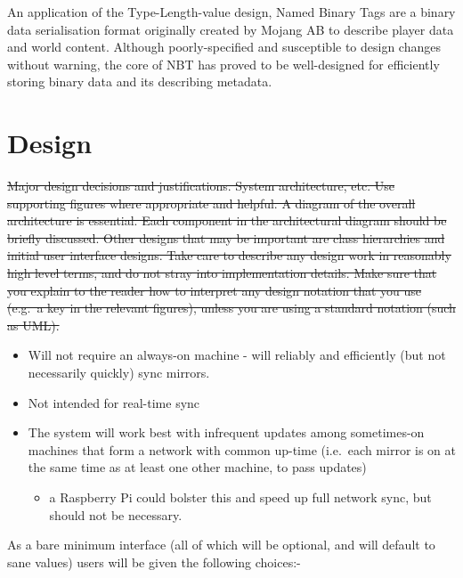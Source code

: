 \documentclass[12pt,a4paper,]{adreport}
\begin{document}
An application of the Type-Length-value design, Named Binary Tags are a
binary data serialisation format originally created by Mojang AB to
describe player data and world content. Although poorly-specified and
susceptible to design changes without warning, the core of NBT has
proved to be well-designed for efficiently storing binary data and its
describing metadata.

\chapter{Design}\label{design}

\sout{Major design decisions and justifications. System architecture,
etc. Use supporting figures where appropriate and helpful. A diagram of
the overall architecture is essential. Each component in the
architectural diagram should be briefly discussed. Other designs that
may be important are class hierarchies and initial user interface
designs. Take care to describe any design work in reasonably high level
terms, and do not stray into implementation details. Make sure that you
explain to the reader how to interpret any design notation that you use
(e.g.~a key in the relevant figures), unless you are using a standard
notation (such as UML).}

\begin{itemize}
\itemsep1pt\parskip0pt
\item
  Will not require an always-on machine - will reliably and efficiently
  (but not necessarily quickly) sync mirrors.
\item
  Not intended for real-time sync
\item
  The system will work best with infrequent updates among sometimes-on
  machines that form a network with common up-time (i.e.~each mirror is
  on at the same time as at least one other machine, to pass updates)

  \begin{itemize}
  \itemsep1pt\parskip0pt
  \item
    a Raspberry Pi could bolster this and speed up full network sync,
    but should not be necessary.
  \end{itemize}
\end{itemize}

As a bare minimum interface (all of which will be optional, and will
default to sane values) users will be given the following choices:-
\end{document}
